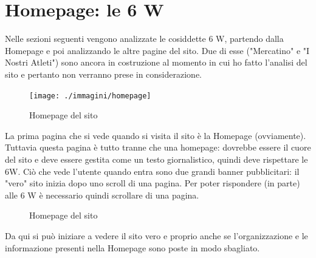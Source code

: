 
\chapter{Homepage: le 6 W}
\label{cap:le 6 w}
Nelle sezioni seguenti vengono analizzate le cosiddette 6 W, partendo dalla Homepage e poi analizzando le altre pagine del sito. Due di esse ("Mercatino" e "I Nostri Atleti") sono ancora in costruzione al momento in cui ho fatto l'analisi del sito e pertanto non verranno prese in considerazione.

\begin{figure}[H]
    \centering
    \texttt{[image: ./immagini/homepage]}
    \caption [Homepage del sito]{Homepage del sito \siteName}
\end{figure}

La prima pagina che si vede quando si visita il sito è la Homepage (ovviamente). Tuttavia questa pagina è tutto tranne che una homepage: dovrebbe essere il cuore del sito e deve essere gestita come un testo giornalistico, quindi deve rispettare le 6W. Ciò che vede l'utente quando entra sono due grandi banner pubblicitari: il "vero" sito inizia dopo uno scroll di una pagina. Per poter rispondere (in parte) alle 6 W è necessario quindi scrollare di una pagina. \\

\begin{figure}[H]
    \centering
        \qquad
	\caption [Homepage del sito]{Homepage del sito \siteName}
\end{figure}

Da qui si può iniziare a vedere il sito vero e proprio anche se l'organizzazione e le informazione presenti nella Homepage sono poste in modo sbagliato.

